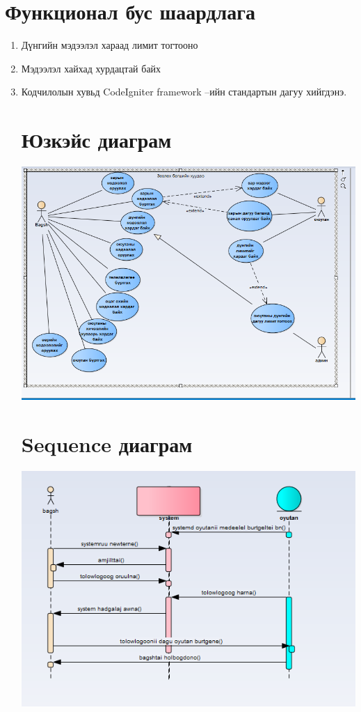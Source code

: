 \documentclass[12pt]{article}
\begin{document}
	\section{Функционал бус шаардлага}
	\begin{enumerate}
		\item Дүнгийн мэдээлэл хараад лимит тогтооно
		\item Мэдээлэл хайхад хурдацтай байх
		\item Кодчилолын хувьд CodeIgniter framework –ийн стандартын дагуу хийгдэнэ.
		\section{Юзкэйс диаграм}
		\includegraphics[scale=0.6]{usecase5}
		\section{Sequence диаграм}
		\includegraphics[scale=0.6]{sequence.png}

\end{enumerate}
\end{document}
